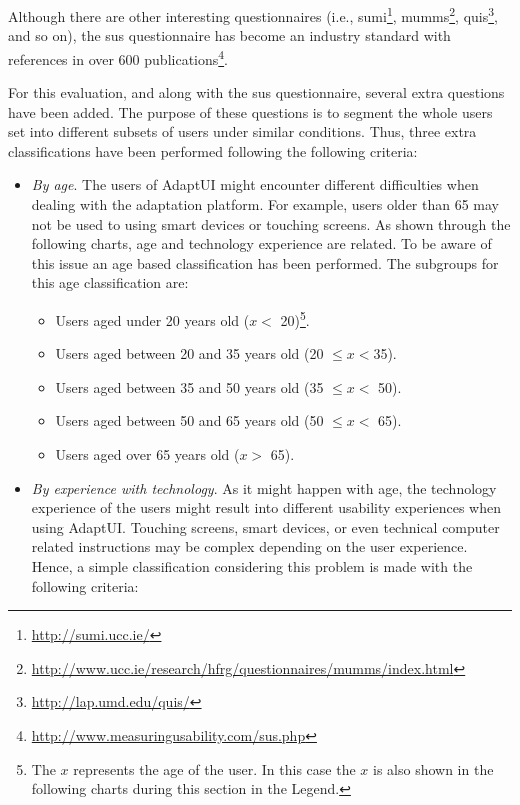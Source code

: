 Although there are other interesting questionnaires (i.e., 
\ac{sumi}\footnote{\url{http://sumi.ucc.ie/}},
\ac{mumms}\footnote{\url{http://www.ucc.ie/research/hfrg/questionnaires/mumms/index.html}},
\ac{quis}\footnote{\url{http://lap.umd.edu/quis/}}, and so on), the \ac{sus} 
questionnaire has become an industry standard with references in over 600 
publications\footnote{\url{http://www.measuringusability.com/sus.php}}.

For this evaluation, and along with the \ac{sus} questionnaire, several extra 
questions have been added. The purpose of these questions is to segment the 
whole users set into different subsets of users under similar conditions. Thus, 
three extra classifications have been performed following the following 
criteria:

\begin{itemize}
  \item \textit{By age}. The users of AdaptUI might encounter different difficulties when
  dealing with the adaptation platform. For example, users older than 65 may not
  be used to using smart devices or touching screens. As shown through the 
  following charts, age and technology experience are related. To be aware of
  this issue an age based classification has been performed. The subgroups for
  this age classification are:
  \begin{itemize}
    \item Users aged under 20 years old ($x <$ 20)\footnote{The $x$ represents
    the age of the user. In this case the $x$ is also shown in the following 
charts
    during this section in the Legend.}.
    \item Users aged between 20 and 35 years old (20 $\leq x < $35).
    \item Users aged between 35 and 50 years old (35 $\leq x <$ 50).
    \item Users aged between 50 and 65 years old (50 $\leq x <$ 65).
    \item Users aged over 65 years old ($x >$ 65).
  \end{itemize}

  \item \textit{By experience with technology}. As it might happen with age, the 
  technology experience of the users might result into different usability 
  experiences when using AdaptUI. Touching screens, smart devices, or even 
  technical computer related instructions may be complex depending on the user 
  experience. Hence, a simple classification considering this problem is made 
  with the following criteria:
  

\end{itemize}

